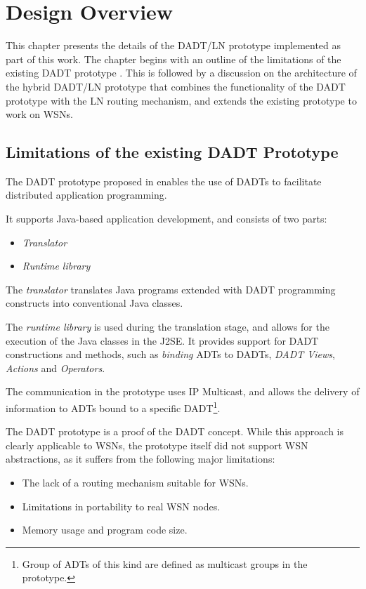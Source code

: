 \chapter{Design Overview}\label{chap:design}

This chapter presents the details of the DADT/LN prototype implemented as part of
this work. The chapter begins with an outline of the limitations of the
existing DADT prototype \cite{migliavacca_DADT:2006}. This is followed by a
discussion on the architecture of the hybrid DADT/LN prototype that combines
the functionality of the DADT prototype with the LN routing mechanism, and
extends the existing prototype to work on WSNs.

\section{Limitations of the existing DADT Prototype}

The DADT prototype proposed in \cite{migliavacca_DADT:2006} enables the use of
DADTs to facilitate distributed application programming.

It supports Java-based application development, and consists of two parts:
\begin{itemize}
  \item \emph{Translator}
  \item \emph{Runtime library} 
\end{itemize}

The \emph{translator} translates Java programs
  extended with DADT programming constructs into conventional Java classes.

The \emph{runtime library} is used during the translation stage, and allows for
the execution of the Java classes in the J2SE. It provides support for DADT
constructions and methods, such as \emph{binding} ADTs to DADTs, \emph{DADT Views}, \emph{Actions} and
\emph{Operators}.

The communication in the prototype uses IP Multicast, and
allows the delivery of information to ADTs bound to a specific DADT\footnote{Group of ADTs of this kind are defined as
multicast groups in the prototype.}.

The DADT prototype is a proof of the DADT concept. While this
approach is clearly applicable to WSNs, the prototype itself did not support WSN
abstractions, as it suffers from the following major limitations:

\begin{itemize}
  \item The lack of a routing mechanism suitable for WSNs.
  \item Limitations in portability to real WSN nodes.
  \item Memory usage and program code size.
\end{itemize}

